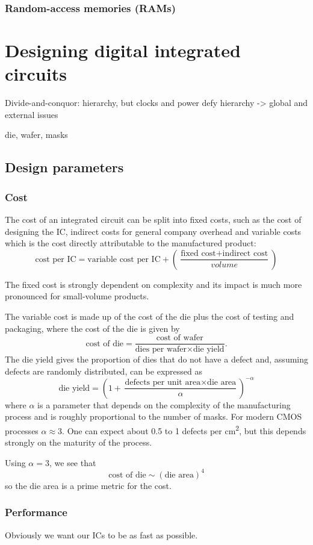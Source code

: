 \documentclass{report}
\begin{document}
\subsection{Random-access memories (RAMs)}

\chapter{Designing digital integrated circuits}
Divide-and-conquor: hierarchy, but clocks and power defy hierarchy -> global and external issues

die, wafer, masks
\section{Design parameters}
\subsection{Cost}
The cost of an integrated circuit can be split into fixed costs, such as the cost of designing the IC, indirect costs for general company overhead and variable costs which is the cost directly attributable to the manufactured product:
\[ \text{cost per IC} = \text{variable cost per IC} + \left(\frac{\text{fixed cost}+\text{indirect cost}}{volume}\right)\]

The fixed cost is strongly dependent on complexity and its impact is much more pronounced for small-volume products.

The variable cost is made up of the cost of the die plus the cost of testing and packaging, where the cost of the die is given by
\[ \text{cost of die} = \frac{\text{cost of wafer}}{\text{dies per wafer}\times \text{die yield}}. \]
The die yield gives the proportion of dies that do not have a defect and, assuming defects are randomly distributed, can be expressed as
\[ \text{die yield} = \left(1+ \frac{\text{defects per unit area}\times \text{die area}}{\alpha}\right)^{-\alpha} \]
where $\alpha$ is a parameter that depends on the complexity of the manufacturing process and is roughly proportional to the number of masks. For modern CMOS processes $\alpha \approx 3$. One can expect about 0.5 to 1 defects per \si{cm^2}, but this depends strongly on the maturity of the process.

Using $\alpha = 3$, we see that
\[ \text{cost of die} \sim (\text{die area})^4 \]
so the die area is a prime metric for the cost.

\subsection{Performance}
Obviously we want our ICs to be as fast as possible.
\end{document}
